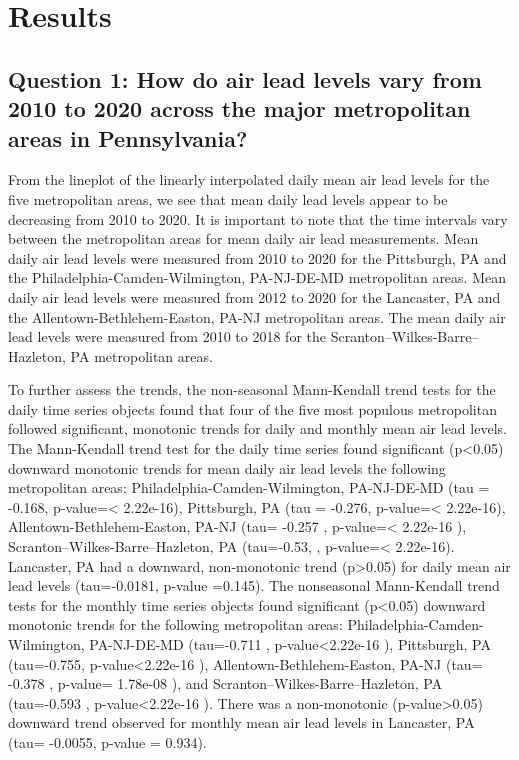 \documentclass[
  12pt,
]{article}
\begin{document}
\newpage

\hypertarget{results}{%
\section{Results}\label{results}}

\hypertarget{question-1-how-do-air-lead-levels-vary-from-2010-to-2020-across-the-major-metropolitan-areas-in-pennsylvania}{%
\subsection{Question 1: How do air lead levels vary from 2010 to 2020
across the major metropolitan areas in
Pennsylvania?}\label{question-1-how-do-air-lead-levels-vary-from-2010-to-2020-across-the-major-metropolitan-areas-in-pennsylvania}}

From the lineplot of the linearly interpolated daily mean air lead
levels for the five metropolitan areas, we see that mean daily lead
levels appear to be decreasing from 2010 to 2020. It is important to
note that the time intervals vary between the metropolitan areas for
mean daily air lead measurements. Mean daily air lead levels were
measured from 2010 to 2020 for the Pittsburgh, PA and the
Philadelphia-Camden-Wilmington, PA-NJ-DE-MD metropolitan areas. Mean
daily air lead levels were measured from 2012 to 2020 for the Lancaster,
PA and the Allentown-Bethlehem-Easton, PA-NJ metropolitan areas. The
mean daily air lead levels were measured from 2010 to 2018 for the
Scranton--Wilkes-Barre--Hazleton, PA metropolitan areas.

To further assess the trends, the non-seasonal Mann-Kendall trend tests
for the daily time series objects found that four of the five most
populous metropolitan followed significant, monotonic trends for daily
and monthly mean air lead levels. The Mann-Kendall trend test for the
daily time series found significant (p\textless0.05) downward monotonic
trends for mean daily air lead levels the following metropolitan areas:
Philadelphia-Camden-Wilmington, PA-NJ-DE-MD (tau = -0.168,
p-value=\textless{} 2.22e-16), Pittsburgh, PA (tau = -0.276,
p-value=\textless{} 2.22e-16), Allentown-Bethlehem-Easton, PA-NJ (tau=
-0.257 , p-value=\textless{} 2.22e-16 ),
Scranton--Wilkes-Barre--Hazleton, PA (tau=-0.53, , p-value=\textless{}
2.22e-16). Lancaster, PA had a downward, non-monotonic trend
(p\textgreater0.05) for daily mean air lead levels (tau=-0.0181, p-value
=0.145). The nonseasonal Mann-Kendall trend tests for the monthly time
series objects found significant (p\textless0.05) downward monotonic
trends for the following metropolitan areas:
Philadelphia-Camden-Wilmington, PA-NJ-DE-MD (tau=-0.711 ,
p-value\textless2.22e-16 ), Pittsburgh, PA (tau=-0.755,
p-value\textless2.22e-16 ), Allentown-Bethlehem-Easton, PA-NJ (tau=
-0.378 , p-value= 1.78e-08 ), and Scranton--Wilkes-Barre--Hazleton, PA
(tau=-0.593 , p-value\textless2.22e-16 ). There was a non-monotonic
(p-value\textgreater0.05) downward trend observed for monthly mean air
lead levels in Lancaster, PA (tau= -0.0055, p-value = 0.934).
\end{document}
